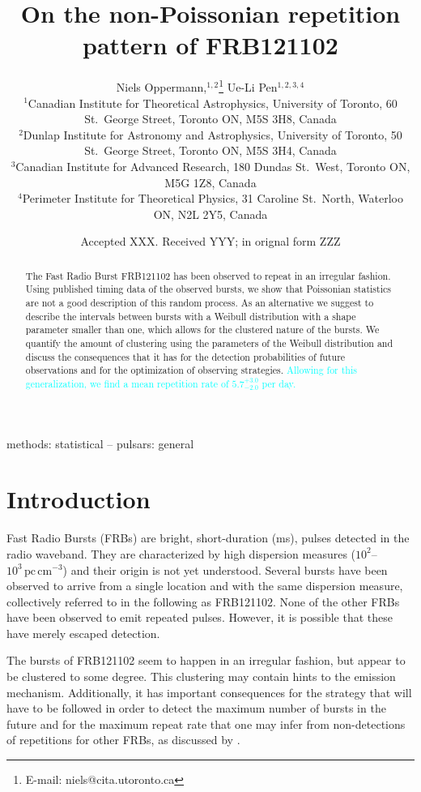 \documentclass[fleqn,usenatbib]{mnras}
\title{On the non-Poissonian repetition pattern of FRB121102}
\author[N. Oppermann et al.]{Niels Oppermann,$^{1,2}$\thanks{E-mail: niels@cita.utoronto.ca}
Ue-Li Pen$^{1,2,3,4}$
\\
$^{1}$Canadian Institute for Theoretical Astrophysics, University of Toronto, 60 St.\ George Street, Toronto ON, M5S 3H8, Canada\\
$^{2}$Dunlap Institute for Astronomy and Astrophysics, University of Toronto, 50 St.\ George Street, Toronto ON, M5S 3H4, Canada\\
$^{3}$Canadian Institute for Advanced Research, 180 Dundas St.\ West, Toronto ON, M5G 1Z8, Canada\\
$^{4}$Perimeter Institute for Theoretical Physics, 31 Caroline St.\ North, Waterloo ON, N2L 2Y5, Canada
}
\date{Accepted XXX. Received YYY; in orignal form ZZZ}
\newcommand{\new}[1]{\textcolor{cyan}{#1}}
\begin{document}
\label{firstpage}
\pagerange{\pageref{firstpage}--\pageref{lastpage}}
\maketitle

\begin{abstract}
	The Fast Radio Burst FRB121102 has been observed to repeat in an irregular fashion. Using published timing data of the observed bursts, we show that Poissonian statistics are not a good description of this random process. As an alternative we suggest to describe the intervals between bursts with a Weibull distribution with a shape parameter smaller than one, which allows for the clustered nature of the bursts. We quantify the amount of clustering using the parameters of the Weibull distribution and discuss the consequences that it has for the detection probabilities of future observations and for the optimization of observing strategies. \new{Allowing for this generalization, we find a mean repetition rate of $5.7^{+3.0}_{-2.0}$ per day.}
\end{abstract}

\begin{keywords}
methods: statistical -- pulsars: general
\end{keywords}


\section{Introduction}
\label{sec:introduction}

Fast Radio Bursts (FRBs) are bright, short-duration (ms), pulses detected in the radio waveband. They are characterized by high dispersion measures ($10^2$--$10^3\,\mathrm{pc}\,\mathrm{cm}^{-3}$) and their origin is not yet understood. Several bursts have been observed to arrive from a single location and with the same dispersion measure, collectively referred to in the following as FRB121102. None of the other FRBs have been observed to emit repeated pulses. However, it is possible that these have merely escaped detection.

The bursts of FRB121102 seem to happen in an irregular fashion, but appear to be clustered to some degree. This clustering may contain hints to the emission mechanism. Additionally, it has important consequences for the strategy that will have to be followed in order to detect the maximum number of bursts in the future and for the maximum repeat rate that one may infer from non-detections of repetitions for other FRBs, as discussed by \citet{connor-2016}.
\end{document}
